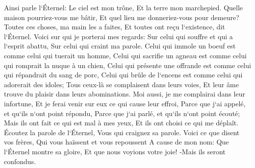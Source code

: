\verse Ainsi parle l`Éternel: Le ciel est mon trône, Et la terre mon marchepied. Quelle maison pourriez-vous me bâtir, Et quel lieu me donneriez-vous pour demeure? 
\verse Toutes ces choses, ma main les a faites, Et toutes ont reçu l`existence, dit l`Éternel. Voici sur qui je porterai mes regards: Sur celui qui souffre et qui a l`esprit abattu, Sur celui qui craint ma parole. 
\verse Celui qui immole un boeuf est comme celui qui tuerait un homme, Celui qui sacrifie un agneau est comme celui qui romprait la nuque à un chien, Celui qui présente une offrande est comme celui qui répandrait du sang de porc, Celui qui brûle de l`encens est comme celui qui adorerait des idoles; Tous ceux-là se complaisent dans leurs voies, Et leur âme trouve du plaisir dans leurs abominations. 
\verse Moi aussi, je me complairai dans leur infortune, Et je ferai venir sur eux ce qui cause leur effroi, Parce que j`ai appelé, et qu`ils n`ont point répondu, Parce que j`ai parlé, et qu`ils n`ont point écouté; Mais ils ont fait ce qui est mal à mes yeux, Et ils ont choisi ce qui me déplaît. 
\verse Écoutez la parole de l`Éternel, Vous qui craignez sa parole. Voici ce que disent vos frères, Qui vous haïssent et vous repoussent A cause de mon nom: Que l`Éternel montre sa gloire, Et que nous voyions votre joie! -Mais ils seront confondus. 
